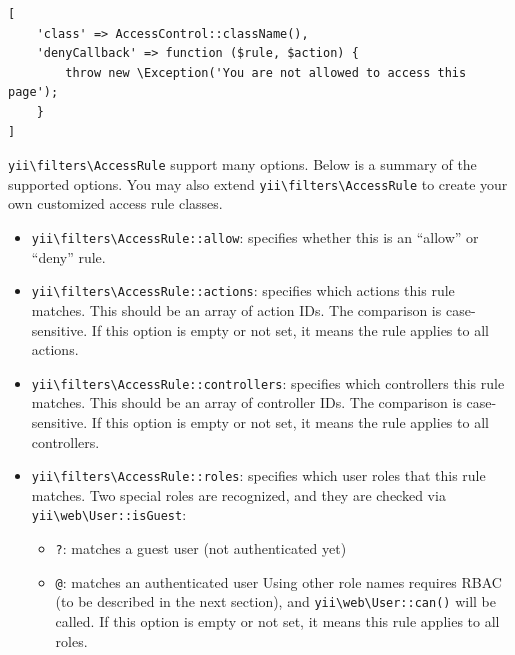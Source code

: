 \lstset{language=php}\begin{lstlisting}
[
    'class' => AccessControl::className(),
    'denyCallback' => function ($rule, $action) {
        throw new \Exception('You are not allowed to access this page');
    }
]
\end{lstlisting}
\texttt{yii{\allowbreak{}\textbackslash}filters{\allowbreak{}\textbackslash}AccessRule} support many options. Below is a summary of the supported options.
You may also extend \texttt{yii{\allowbreak{}\textbackslash}filters{\allowbreak{}\textbackslash}AccessRule} to create your own customized access rule classes.

\begin{itemize}
\item \texttt{yii{\allowbreak{}\textbackslash}filters{\allowbreak{}\textbackslash}AccessRule\allowbreak{}::\allowbreak{}allow}: specifies whether this is an ``allow'' or ``deny'' rule.


\item \texttt{yii{\allowbreak{}\textbackslash}filters{\allowbreak{}\textbackslash}AccessRule\allowbreak{}::\allowbreak{}actions}: specifies which actions this rule matches. This should
be an array of action IDs. The comparison is case-sensitive. If this option is empty or not set,
it means the rule applies to all actions.


\item \texttt{yii{\allowbreak{}\textbackslash}filters{\allowbreak{}\textbackslash}AccessRule\allowbreak{}::\allowbreak{}controllers}: specifies which controllers this rule
matches. This should be an array of controller IDs. The comparison is case-sensitive. If this option is
empty or not set, it means the rule applies to all controllers.


\item \texttt{yii{\allowbreak{}\textbackslash}filters{\allowbreak{}\textbackslash}AccessRule\allowbreak{}::\allowbreak{}roles}: specifies which user roles that this rule matches.
Two special roles are recognized, and they are checked via \texttt{yii{\allowbreak{}\textbackslash}web{\allowbreak{}\textbackslash}User\allowbreak{}::\allowbreak{}isGuest}:

\begin{itemize}
\item \lstinline|?|: matches a guest user (not authenticated yet)
\item \lstinline|@|: matches an authenticated user
Using other role names requires RBAC (to be described in the next section), and \texttt{yii{\allowbreak{}\textbackslash}web{\allowbreak{}\textbackslash}User\allowbreak{}::\allowbreak{}can()} will be called.
If this option is empty or not set, it means this rule applies to all roles.
\end{itemize}


\end{itemize}
